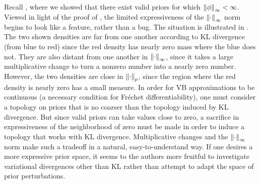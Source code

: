 Recall , where we showed that there exist valid
priors for which $\left\Vert\phi\right\Vert_{\infty} < \infty$.  Viewed in light of the
proof of , the limited expressiveness of the
$\left\Vert\cdot\right\Vert_{\infty}$ norm begins to look like a feature, rather than a bug.
The situation is illustrated in  .  The two shown densities
are far from one another according to KL divergence (from blue to red) since the
red density has nearly zero mass where the blue does not.  They are also distant
from one another in $\left\Vert\cdot\right\Vert_{\infty}$, since it takes a large multiplicative
change to turn a nonzero number into a nearly zero number.  However, the two
densities are close in $\left\Vert\cdot\right\Vert_{p}$, since the region where the red
density is nearly zero has a small measure. In order for VB approximations to be
continuous (a necessary condition for Fr{\'e}chet differentiability), one must
consider a topology on priors that is no coarser than the topology induced by KL
divergence.  But since valid priors can take values close to zero, a sacrifice
in expressiveness of the neighborhood of zero must be made in order to induce a
topology that works with KL divergence.  Multiplicative changes and the
$\left\Vert\cdot\right\Vert_{\infty}$ norm make such a tradeoff in a natural, easy-to-understand
way.  If one desires a more expressive prior space, it seems to the authors more
fruitful to investigate variational divergences other than KL rather than
attempt to adapt the space of prior perturbations.

\FunctionDistFig{}
